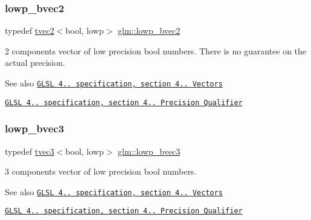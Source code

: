 \subsubsection{\texorpdfstring{lowp\+\_\+bvec2}{lowp\_bvec2}}
{\footnotesize\ttfamily typedef \hyperlink{structglm_1_1tvec2}{tvec2}$<$bool, lowp$>$ \hyperlink{group__core__precision_gaf17553233b30d9ed413e822847c4ea8f}{glm\+::lowp\+\_\+bvec2}}

2 components vector of low precision bool numbers. There is no guarantee on the actual precision.

\begin{DoxySeeAlso}{See also}
\href{http://www.opengl.org/registry/doc/GLSLangSpec.4.20.8.pdf}{\tt G\+L\+SL 4.. specification, section 4.. Vectors} 

\href{http://www.opengl.org/registry/doc/GLSLangSpec.4.20.8.pdf}{\tt G\+L\+SL 4.. specification, section 4.. Precision Qualifier} 
\end{DoxySeeAlso}
\mbox{\label{group__core__precision_ga9ebdb78c611619993b9d5b182010529d}} 
\subsubsection{\texorpdfstring{lowp\+\_\+bvec3}{lowp\_bvec3}}
{\footnotesize\ttfamily typedef \hyperlink{structglm_1_1tvec3}{tvec3}$<$bool, lowp$>$ \hyperlink{group__core__precision_ga9ebdb78c611619993b9d5b182010529d}{glm\+::lowp\+\_\+bvec3}}

3 components vector of low precision bool numbers.

\begin{DoxySeeAlso}{See also}
\href{http://www.opengl.org/registry/doc/GLSLangSpec.4.20.8.pdf}{\tt G\+L\+SL 4.. specification, section 4.. Vectors} 

\href{http://www.opengl.org/registry/doc/GLSLangSpec.4.20.8.pdf}{\tt G\+L\+SL 4.. specification, section 4.. Precision Qualifier} 
\end{DoxySeeAlso}
\mbox{\label{group__core__precision_ga512926597aea7a1afe60ee7b983db86d}} 
